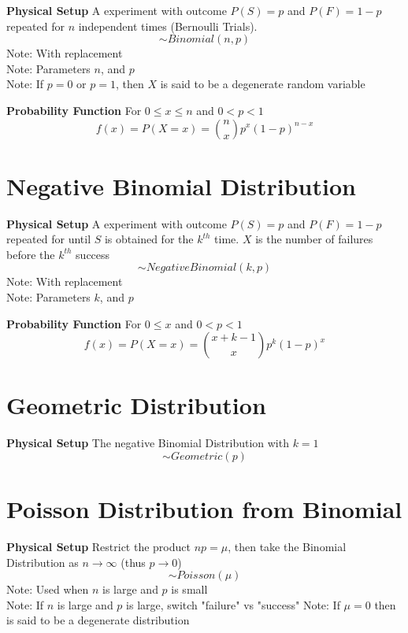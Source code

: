 \documentclass[11pt,notitlepage]{report}
\begin{document}
\textbf{Physical Setup} A experiment with outcome $P(S) = p$ and $P(F) = 1 - p$ repeated for $n$ independent times (Bernoulli Trials).
$$\sim Binomial(n, p)$$
\hspace*{5mm} Note: With replacement\\
\hspace*{5mm} Note: Parameters $n$, and $p$\\
\hspace*{5mm} Note: If $p = 0$ or $p = 1$, then $X$ is said to be a degenerate random variable

\textbf{Probability Function} For $0\leq x \leq n$ and $0 < p < 1$
$$f(x) = P(X = x) = \binom{n}{x}p^x(1-p)^{n-x}$$

\newpage

\section{Negative Binomial Distribution}

\textbf{Physical Setup} A experiment with outcome $P(S) = p$ and $P(F) = 1 - p$ repeated for until $S$ is obtained for the $k^{th}$ time. $X$ is the number of failures before the $k^{th}$ success
$$\sim Negative Binomial(k, p)$$
\hspace*{5mm} Note: With replacement\\
\hspace*{5mm} Note: Parameters $k$, and $p$

\textbf{Probability Function} For $0\leq x$ and $0 < p < 1$
$$f(x) = P(X = x) = \binom{x+k-1}{x}p^k(1-p)^x$$

\section{Geometric Distribution}

\textbf{Physical Setup} The negative Binomial Distribution with $k = 1$
$$\sim Geometric(p)$$

\section{Poisson Distribution from Binomial}

\textbf{Physical Setup} Restrict the product $np = \mu$, then take the Binomial Distribution as $n \rightarrow \infty$ (thus $p \rightarrow 0$)
$$\sim Poisson(\mu)$$
\hspace*{5mm} Note: Used when $n$ is large and $p$ is small\\
\hspace*{5mm} Note: If $n$ is large and $p$ is large, switch "failure" vs "success"
\hspace*{5mm} Note: If $\mu = 0$ then is said to be a degenerate distribution
\end{document}
